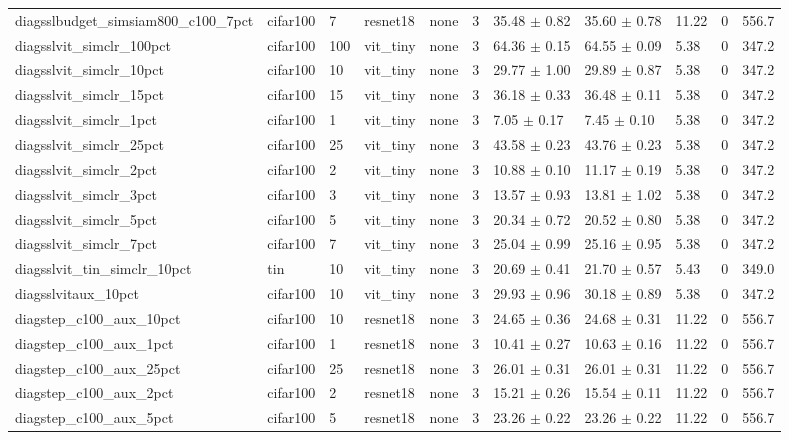 \begin{tabular}{lllllllllll}
diagsslbudget_simsiam800_c100_7pct & cifar100 & 7 & resnet18 & none & 3 & 35.48 $\pm$ 0.82 & 35.60 $\pm$ 0.78 & 11.22 & 0 & 556.7 \\
diagsslvit_simclr_100pct & cifar100 & 100 & vit_tiny & none & 3 & 64.36 $\pm$ 0.15 & 64.55 $\pm$ 0.09 & 5.38 & 0 & 347.2 \\
diagsslvit_simclr_10pct & cifar100 & 10 & vit_tiny & none & 3 & 29.77 $\pm$ 1.00 & 29.89 $\pm$ 0.87 & 5.38 & 0 & 347.2 \\
diagsslvit_simclr_15pct & cifar100 & 15 & vit_tiny & none & 3 & 36.18 $\pm$ 0.33 & 36.48 $\pm$ 0.11 & 5.38 & 0 & 347.2 \\
diagsslvit_simclr_1pct & cifar100 & 1 & vit_tiny & none & 3 & 7.05 $\pm$ 0.17 & 7.45 $\pm$ 0.10 & 5.38 & 0 & 347.2 \\
diagsslvit_simclr_25pct & cifar100 & 25 & vit_tiny & none & 3 & 43.58 $\pm$ 0.23 & 43.76 $\pm$ 0.23 & 5.38 & 0 & 347.2 \\
diagsslvit_simclr_2pct & cifar100 & 2 & vit_tiny & none & 3 & 10.88 $\pm$ 0.10 & 11.17 $\pm$ 0.19 & 5.38 & 0 & 347.2 \\
diagsslvit_simclr_3pct & cifar100 & 3 & vit_tiny & none & 3 & 13.57 $\pm$ 0.93 & 13.81 $\pm$ 1.02 & 5.38 & 0 & 347.2 \\
diagsslvit_simclr_5pct & cifar100 & 5 & vit_tiny & none & 3 & 20.34 $\pm$ 0.72 & 20.52 $\pm$ 0.80 & 5.38 & 0 & 347.2 \\
diagsslvit_simclr_7pct & cifar100 & 7 & vit_tiny & none & 3 & 25.04 $\pm$ 0.99 & 25.16 $\pm$ 0.95 & 5.38 & 0 & 347.2 \\
diagsslvit_tin_simclr_10pct & tin & 10 & vit_tiny & none & 3 & 20.69 $\pm$ 0.41 & 21.70 $\pm$ 0.57 & 5.43 & 0 & 349.0 \\
diagsslvitaux_10pct & cifar100 & 10 & vit_tiny & none & 3 & 29.93 $\pm$ 0.96 & 30.18 $\pm$ 0.89 & 5.38 & 0 & 347.2 \\
diagstep_c100_aux_10pct & cifar100 & 10 & resnet18 & none & 3 & 24.65 $\pm$ 0.36 & 24.68 $\pm$ 0.31 & 11.22 & 0 & 556.7 \\
diagstep_c100_aux_1pct & cifar100 & 1 & resnet18 & none & 3 & 10.41 $\pm$ 0.27 & 10.63 $\pm$ 0.16 & 11.22 & 0 & 556.7 \\
diagstep_c100_aux_25pct & cifar100 & 25 & resnet18 & none & 3 & 26.01 $\pm$ 0.31 & 26.01 $\pm$ 0.31 & 11.22 & 0 & 556.7 \\
diagstep_c100_aux_2pct & cifar100 & 2 & resnet18 & none & 3 & 15.21 $\pm$ 0.26 & 15.54 $\pm$ 0.11 & 11.22 & 0 & 556.7 \\
diagstep_c100_aux_5pct & cifar100 & 5 & resnet18 & none & 3 & 23.26 $\pm$ 0.22 & 23.26 $\pm$ 0.22 & 11.22 & 0 & 556.7 \\

\end{tabular}
